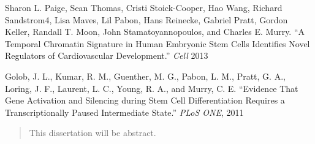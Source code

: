 \begin{frontmatter}
\begin{vitapage}
\begin{publications}
      \item Sharon L. Paige, Sean Thomas, Cristi Stoick-Cooper, Hao Wang, Richard Sandstrom4, Lisa Maves, Lil Pabon, Hans Reinecke, Gabriel Pratt, Gordon Keller, Randall T. Moon, John Stamatoyannopoulos, and Charles E. Murry. ``A Temporal Chromatin Signature in Human Embryonic Stem Cells Identifies Novel Regulators of Cardiovascular Development.'' \emph{Cell} 2013
      \item Golob, J. L., Kumar, R. M., Guenther, M. G., Pabon, L. M., Pratt, G. A., Loring, J. F., Laurent, L. C., Young, R. A., and Murry, C. E. ``Evidence That Gene Activation and Silencing during Stem Cell Differentiation Requires a Transcriptionally Paused Intermediate State.'' \emph{PLoS ONE}, 2011

\end{publications}
\end{vitapage}


%
%
\begin{abstract}
  This dissertation will be abstract.
\end{abstract}


\end{frontmatter}
